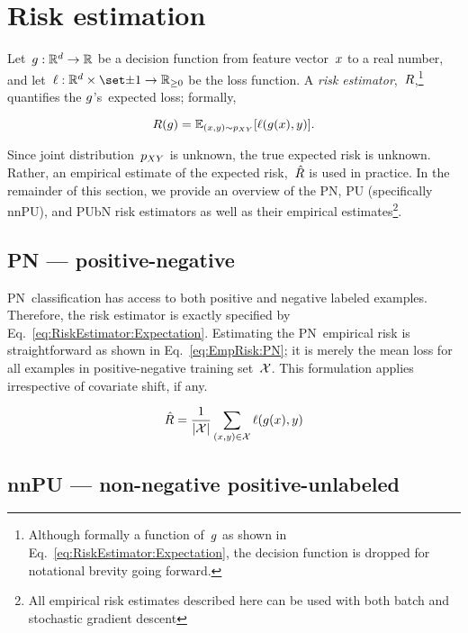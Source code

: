 \section{Risk estimation}\label{sec:RiskEstimators}

Let~${g:\mathbb{R}^{d}\rightarrow\mathbb{R}}$ be a decision function from feature vector~$x$ to a real number, and let~$\func{\loss}{\domainX \times \domainY}{\real_{{\geq}0}}$ be the loss function.  A \textit{risk estimator},~$R$,\footnote{Although formally a function of~$g$ as shown in Eq.~\eqref{eq:RiskEstimator:Expectation}, the decision function is dropped for notational brevity going forward.} quantifies the $g$'s~expected loss; formally,

\begin{equation}\label{eq:RiskEstimator:Expectation}
  R(g) = \mathbb{E}_{(x,y) \sim p_{XY}}\lbrack\ell\mathopen{}\left(g\mathopen{}\left(x\right)\mathclose{},y\right)\mathclose{}\rbrack\text{.}
\end{equation}

Since joint distribution~$p_{XY}$ is unknown, the true expected risk is unknown.  Rather, an empirical estimate of the expected risk,~$\hat{R}$ is used in practice.  In the remainder of this section, we provide an overview of the PN, PU (specifically nnPU), and PUbN risk estimators as well as their empirical estimates\footnote{All empirical risk estimates described here can be used with both batch and stochastic gradient descent}.

\subsection{PN --- positive-negative}

PN~classification has access to both positive and negative labeled examples.  Therefore, the risk estimator is exactly specified by Eq.~\eqref{eq:RiskEstimator:Expectation}.  Estimating the PN~empirical risk is straightforward as shown in Eq.~\eqref{eq:EmpRisk:PN}; it is merely the mean loss for all examples in positive-negative training set~$\mathcal{X}$.  This formulation applies irrespective of covariate shift, if any.

\begin{equation}\label{eq:EmpRisk:PN}
  \hat{R} = \frac{1}{\lvert\mathcal{X}\rvert} \sum_{(x,y) \in \mathcal{X}} \ell\mathopen{}\left(g\mathopen{}\left(x\right)\mathclose{},y\right)\mathclose{}
\end{equation}

\subsection{nnPU --- non-negative positive-unlabeled}

